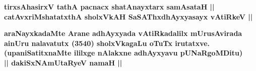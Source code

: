 \begin{center}

{\bf tirxsAhasirxV tathA pacnacx shatAnayxtarx samAsataH || \\}
{\bf catAvxriMshatatxthA sholxVkAH SaSAThxdhAyxyasayx vAtiRkeV ||}

\end{center}

\begin{center}

{\bf araNayxkadaMte Arane adhAyxyada vAtiRkadalilx mUrusAvirada ainUru nalavatutx (3540) sholxVkagaLu oTuTx irutatxve.}\\
\smallskip
{\bf (upaniSatitxnaMte ililxge nAlakxne adhAyxyavu pUNaRgoMDitu)}\\
\smallskip
{\bf || dakiSxNAmUtaRyeV namaH ||}
\end{center}

